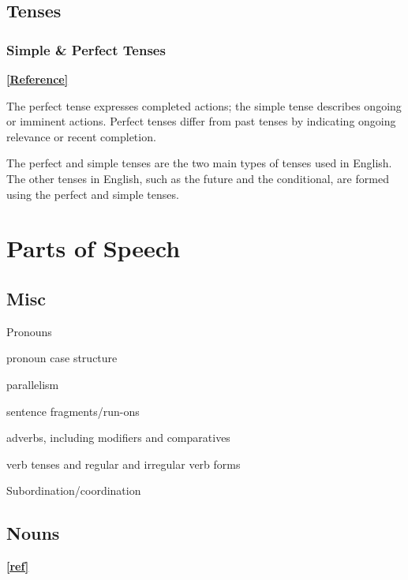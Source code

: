 \documentclass{book}
\begin{document}
\chapter{Tenses}
\section{Simple \& Perfect Tenses}
\textbf{\href{https://promova.com/english-grammar/perfect-vs-simple-tenses-in-english}{[Reference]}}

The perfect tense expresses completed actions; the simple tense describes ongoing or imminent actions. Perfect tenses differ from past tenses by indicating ongoing relevance or recent completion.

The perfect and simple tenses are the two main types of tenses used in English. The other tenses in English, such as the future and the conditional, are formed using the perfect and simple tenses.

\part{Parts of Speech}

\chapter{Misc}

Pronouns

pronoun case structure

parallelism

sentence fragments/run-ons

adverbs, including modifiers and comparatives

verb tenses and regular and irregular verb forms

Subordination/coordination


\chapter{Nouns}

\textbf{\href{https://en.wikibooks.org/wiki/English_Grammar/Basic_Parts_of_Speech/Nouns}{[ref]}}
\end{document}
